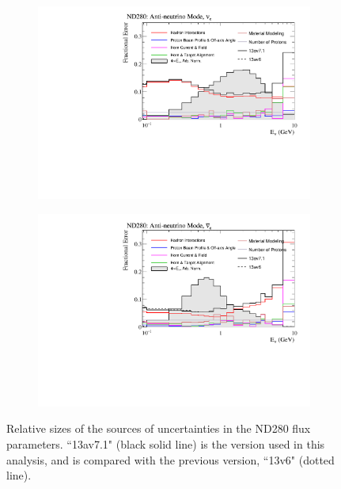 \begin{figure}[!htbp]
\begin{subfigure}{.49\textwidth}
\end{subfigure}
\begin{subfigure}{.49\textwidth}
  \centering
  \includegraphics[width=0.99\linewidth]{figs/flux_error_t2k_nd5_rhc_nue}
\end{subfigure}
\begin{subfigure}{.49\textwidth}
  \centering
  \includegraphics[width=0.99\linewidth]{figs/flux_error_t2k_nd5_rhc_nuebar}
\end{subfigure}
\caption{Relative sizes of the sources of uncertainties in the ND280 flux parameters. ``13av7.1" (black solid line) is the version used in this analysis, and is compared with the previous version, ``13v6" (dotted line).}\label{fig:fluxsourceND}
\end{figure}

